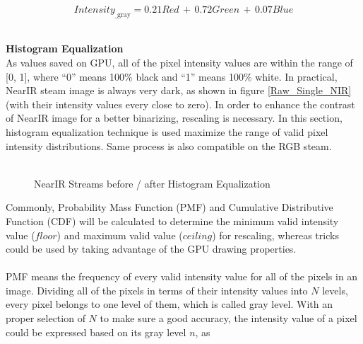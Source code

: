 \begin{equation}
%
Intensity_{\text{\_gray}} =  0.21 Red\,  + \, 0.72 Green \, + \, 0.07 Blue
%
\end{equation}%
%
\\\par%
 \qquad \textbf{Histogram Equalization}\\%
As values saved on GPU, all of the pixel intensity values are within the range of [0, 1], where \enquote{0} means 100\% black and \enquote{1}  means 100\% white. In practical, NearIR steam image is always very dark, as shown in figure \ref{Raw_Single_NIR} (with their intensity values every close to zero).  In order to enhance the contrast of NearIR image for a better binarizing, rescaling is necessary. In this section, histogram equalization technique is used maximize the range of valid pixel intensity distributions. Same process is also compatible on the RGB steam.\\\\
%
 \begin{figure}[h]
\hspace*{-0.5cm}
\centering
{}
\caption{NearIR Streams before / after Histogram Equalization}
\label{Histogram_Equalization}
\end{figure}%
%
Commonly, Probability Mass Function (PMF) and Cumulative Distributive Function (CDF) will be calculated to determine the minimum valid intensity value (\(floor\)) and maximum valid value (\(ceiling\)) for rescaling, whereas tricks could be used by taking advantage of the GPU drawing properties.\\%
\\%
PMF means the frequency of every valid intensity value for all of the pixels in an image. Dividing all of the pixels in terms of their intensity values into \(N\) levels, every pixel belongs to one level of them, which is called gray level. With an proper selection of \(N\) to make sure a good accuracy, the intensity value of a pixel could be expressed based on its gray level \(n\), as\par%

